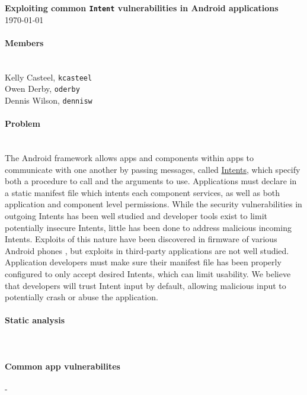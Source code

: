 \documentclass[12pt,a4paper]{article} \usepackage{verbatim}
\begin{document}
 

\flushleft\textbf{Exploiting common \texttt{Intent} vulnerabilities in Android %
applications}\\ \today\\

\paragraph{Members} ~\\

Kelly Casteel, \texttt{kcasteel}\\ Owen Derby, \texttt{oderby}\\ Dennis Wilson,
\texttt{dennisw}\\

\paragraph{Problem} ~\\ The Android framework allows apps and components within
apps to communicate with one another by passing messages, called
\href{https://developer.android.com/reference/android/content/Intent.html}{Intents},
which specify both a procedure to call and the arguments to use. Applications
must declare in a static manifest file which intents each component services, as
well as both application and component level permissions. While the security
vulnerabilities in outgoing Intents has been well studied
\cite{chin_analyzing_2011} and developer tools exist to limit potentially
insecure Intents, little has been done to address malicious incoming Intents.
Exploits of this nature have been discovered in firmware of various Android
phones \cite{grace_systematic_2012}, but exploits in third-party applications
are not well studied. Application developers must make sure their manifest file
has been properly configured to only accept desired Intents, which can limit
usability. We believe that developers will trust Intent input by default,
allowing malicious input to potentially crash or abuse the application.

\paragraph{Static analysis} ~\\

\paragraph{Common app vulnerabilites} -\\
\end{document}
